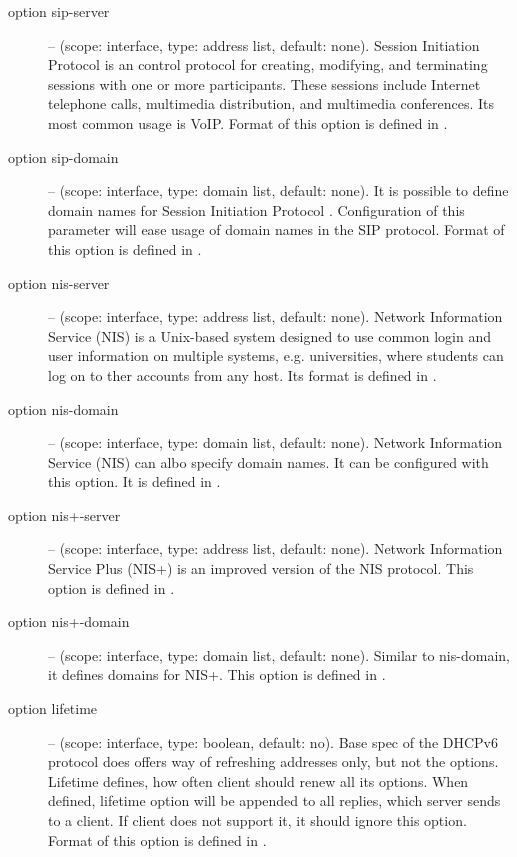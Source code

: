 \begin{description}
 \item[option sip-server] -- (scope: interface, type: address list, default:
   none). Session Initiation Protocol \cite{rfc3263} is an control
   protocol for creating, modifying, and terminating sessions with one
   or more participants. These sessions include Internet telephone
   calls, multimedia distribution, and multimedia conferences. Its
   most common usage is VoIP. Format of this option is defined in
   \cite{rfc3319}.

 \item[option sip-domain] -- (scope: interface, type: domain list, default:
   none). It is possible to define domain names for Session Initiation
   Protocol \cite{rfc3263}. Configuration of this parameter will ease
   usage of domain names in the SIP protocol. Format of this option is
   defined in \cite{rfc3319}.

 \item[option nis-server] -- (scope: interface, type: address list, default:
   none). Network Information Service (NIS) is a Unix-based system
   designed to use common login and user information on multiple
   systems, e.g. universities, where students can log on to ther
   accounts from any host. Its format is defined in \cite{rfc3898}.

 \item[option nis-domain] -- (scope: interface, type: domain list, default:
   none). Network Information Service (NIS) can albo specify domain
   names. It can be configured with this option. It is defined in
   \cite{rfc3898}.

 \item[option nis+-server] -- (scope: interface, type: address list, default:
   none). Network Information Service Plus (NIS+) is an improved
   version of the NIS protocol. This option is defined in
   \cite{rfc3898}.

 \item[option nis+-domain] -- (scope: interface, type: domain list, default:
   none). Similar to nis-domain, it defines domains for NIS+. This
   option is defined in \cite{rfc3898}.

 \item[option lifetime] -- (scope: interface, type: boolean, default:
   no). Base spec of the DHCPv6 protocol does offers way of refreshing
   addresses only, but not the options. Lifetime defines, how often
   client should renew all its options. When defined, lifetime option
   will be appended to all replies, which server sends to a client. If
   client does not support it, it should ignore this option. Format of
   this option is defined in \cite{rfc4242}.


\end{description}
